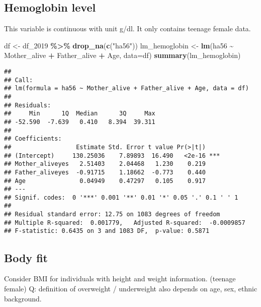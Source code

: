 \documentclass[
]{article}
\newenvironment{Shaded}{\begin{snugshade}}{\end{snugshade}}
\newcommand{\AttributeTok}[1]{\textcolor[rgb]{0.13,0.29,0.53}{#1}}
\newcommand{\FunctionTok}[1]{\textcolor[rgb]{0.13,0.29,0.53}{\textbf{#1}}}
\newcommand{\NormalTok}[1]{#1}
\newcommand{\OtherTok}[1]{\textcolor[rgb]{0.56,0.35,0.01}{#1}}
\newcommand{\SpecialCharTok}[1]{\textcolor[rgb]{0.81,0.36,0.00}{\textbf{#1}}}
\newcommand{\StringTok}[1]{\textcolor[rgb]{0.31,0.60,0.02}{#1}}
\begin{document}
\hypertarget{hemoglobin-level}{%
\subsection{Hemoglobin level}\label{hemoglobin-level}}

This variable is continuous with unit g/dl. It only contains teenage
female data.

\begin{Shaded}
\begin{Highlighting}[]
\NormalTok{df }\OtherTok{\textless{}{-}}\NormalTok{ df\_2019 }\SpecialCharTok{\%\textgreater{}\%} \FunctionTok{drop\_na}\NormalTok{(}\FunctionTok{c}\NormalTok{(}\StringTok{"ha56"}\NormalTok{))}
\NormalTok{lm\_hemoglobin }\OtherTok{\textless{}{-}} \FunctionTok{lm}\NormalTok{(ha56 }\SpecialCharTok{\textasciitilde{}}\NormalTok{ Mother\_alive }\SpecialCharTok{+}\NormalTok{ Father\_alive }\SpecialCharTok{+}\NormalTok{ Age, }\AttributeTok{data=}\NormalTok{df)}
\FunctionTok{summary}\NormalTok{(lm\_hemoglobin)}
\end{Highlighting}
\end{Shaded}

\begin{verbatim}
## 
## Call:
## lm(formula = ha56 ~ Mother_alive + Father_alive + Age, data = df)
## 
## Residuals:
##     Min      1Q  Median      3Q     Max 
## -52.590  -7.639   0.410   8.394  39.311 
## 
## Coefficients:
##                  Estimate Std. Error t value Pr(>|t|)    
## (Intercept)     130.25036    7.89893  16.490   <2e-16 ***
## Mother_aliveyes   2.51403    2.04468   1.230    0.219    
## Father_aliveyes  -0.91715    1.18662  -0.773    0.440    
## Age               0.04949    0.47297   0.105    0.917    
## ---
## Signif. codes:  0 '***' 0.001 '**' 0.01 '*' 0.05 '.' 0.1 ' ' 1
## 
## Residual standard error: 12.75 on 1083 degrees of freedom
## Multiple R-squared:  0.001779,   Adjusted R-squared:  -0.0009857 
## F-statistic: 0.6435 on 3 and 1083 DF,  p-value: 0.5871
\end{verbatim}

\hypertarget{body-fit}{%
\subsection{Body fit}\label{body-fit}}

Consider BMI for individuals with height and weight information.
(teenage female) Q: definition of overweight / underweight also depends
on age, sex, ethnic background.
\end{document}
